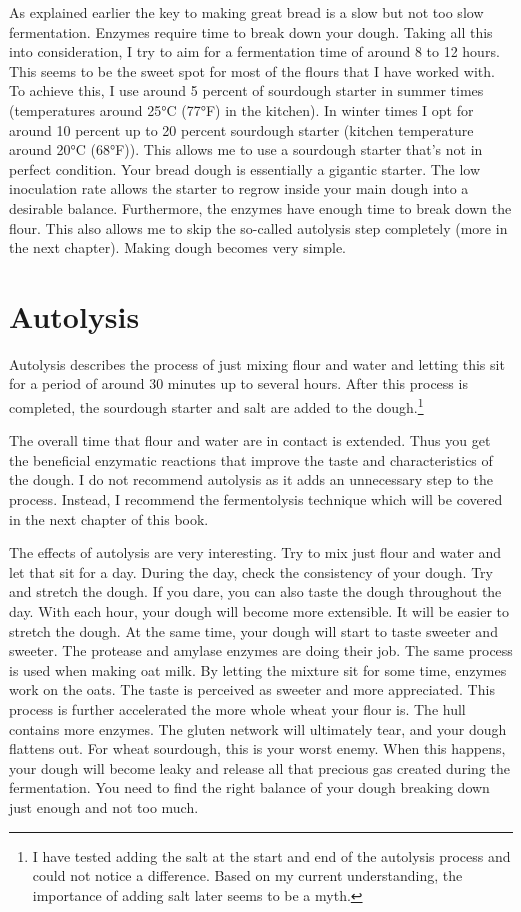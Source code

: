 As explained earlier the key to making great bread is a slow but not too slow
fermentation. Enzymes require time to break down your dough. Taking all this
into consideration, I try to aim for a fermentation time of around 8 to 12 hours. This seems to be
the sweet spot for most of the flours that I have worked with. To achieve this,
I use around 5 percent of sourdough starter in summer times (temperatures
around 25°C (77°F) in the kitchen). In winter times I opt for around 10 percent
up to 20 percent sourdough starter (kitchen temperature around 20°C (68°F)). This
allows me to use a sourdough starter that's not in perfect condition. Your
bread dough is essentially a gigantic starter. The low inoculation rate allows
the starter to regrow inside your main dough into a desirable balance.
Furthermore, the enzymes have enough time to break down the flour. This also
allows me to skip the so-called autolysis step completely (more in the next chapter).
Making dough becomes very simple.

\section{Autolysis}
\label{section:autolysis}

Autolysis describes the process of just mixing flour and water and letting
this sit for a period of around 30 minutes up to several hours. After this
process is completed, the sourdough starter and salt are added to the
dough.\footnote{I have tested adding the salt at the start and end of the
autolysis process and could not notice a difference. Based on my current
understanding, the importance of adding salt later seems to be a myth.}

The overall time that flour and water are in contact is extended. Thus you get the
beneficial enzymatic reactions that improve the taste and characteristics of the
dough. I do not recommend autolysis as it adds an unnecessary step to the
process. Instead, I recommend the fermentolysis technique which will be covered in the
next chapter of this book.

The effects of autolysis are very interesting. Try to mix just flour and
water and let that sit for a day. During the day, check the consistency of
your dough. Try and stretch the dough. If you dare, you can also taste the
dough throughout the day. With each hour, your dough will become
more extensible. It will be easier to stretch the dough. At the same time, your
dough will start to taste sweeter and sweeter. The protease and amylase enzymes
are doing their job. The same process is used when making oat milk. By letting
the mixture sit for some time, enzymes work on the oats. The taste is perceived as
sweeter and more appreciated. This process is further accelerated the more
whole wheat your flour is. The hull contains more enzymes. The gluten network
will ultimately tear, and your dough flattens out. For wheat sourdough, this is
your worst enemy. When this happens, your dough will become leaky and release
all that precious gas created during the fermentation. You need to find the
right balance of your dough breaking down just enough and not too much.

